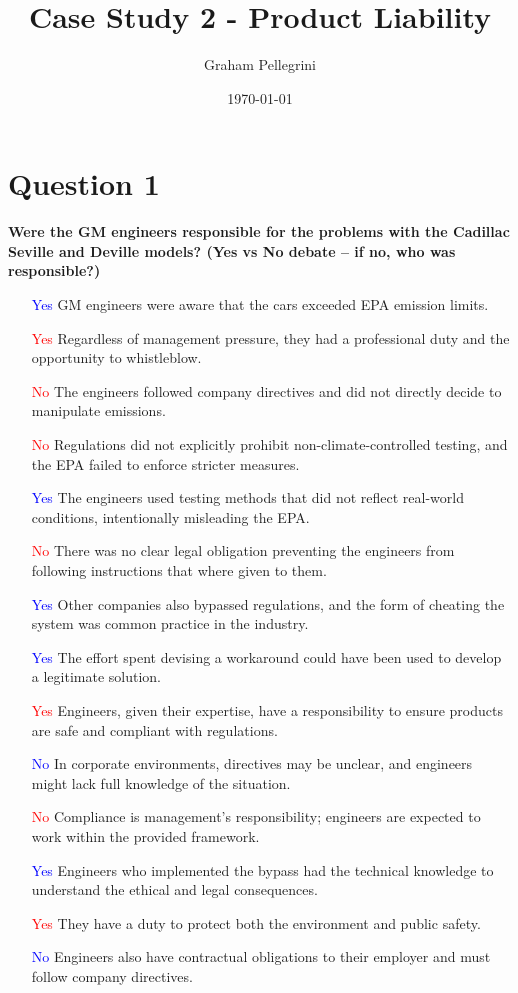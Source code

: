 \documentclass[12pt]{article}
\title{Case Study 2 - Product Liability}
\author{Graham Pellegrini }
\date{\today}
\begin{document}
\maketitle

\section{Question 1}
\textbf{Were the GM engineers responsible for the problems with the Cadillac Seville and Deville models? (Yes vs No debate – if no, who was responsible?)}

\begin{itemize}
    \item [\textcolor{blue}{Yes}] GM engineers were aware that the cars exceeded EPA emission limits.
    \item [\textcolor{red}{Yes}] Regardless of management pressure, they had a professional duty and the opportunity to whistleblow.
    \item [\textcolor{red}{No}] The engineers followed company directives and did not directly decide to manipulate emissions.
    \item [\textcolor{red}{No}] Regulations did not explicitly prohibit non-climate-controlled testing, and the EPA failed to enforce stricter measures.
    \item [\textcolor{blue}{Yes}] The engineers used testing methods that did not reflect real-world conditions, intentionally misleading the EPA.
    \item [\textcolor{red}{No}] There was no clear legal obligation preventing the engineers from following instructions that where given to them.
    \item [\textcolor{blue}{Yes}] Other companies also bypassed regulations, and the form of cheating the system was common practice in the industry.
    \item [\textcolor{blue}{Yes}] The effort spent devising a workaround could have been used to develop a legitimate solution.
    \item [\textcolor{red}{Yes}] Engineers, given their expertise, have a responsibility to ensure products are safe and compliant with regulations.
    \item [\textcolor{blue}{No}] In corporate environments, directives may be unclear, and engineers might lack full knowledge of the situation.
    \item [\textcolor{red}{No}] Compliance is management's responsibility; engineers are expected to work within the provided framework.
    \item [\textcolor{blue}{Yes}] Engineers who implemented the bypass had the technical knowledge to understand the ethical and legal consequences.
    \item [\textcolor{red}{Yes}] They have a duty to protect both the environment and public safety.
    \item [\textcolor{blue}{No}] Engineers also have contractual obligations to their employer and must follow company directives.
\end{itemize}
\end{document}

